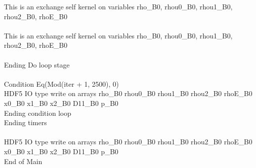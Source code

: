 \documentclass{article}
\begin{document}
\noindent This is an exchange self kernel on variables rho_B0, rhou0_B0, rhou1_B0, rhou2_B0, rhoE_B0\\\\\noindent This is an exchange self kernel on variables rho_B0, rhou0_B0, rhou1_B0, rhou2_B0, rhoE_B0\\\\\noindent Ending Do loop stage\\
\\\noindent Condition Eq(Mod(iter + 1, 2500), 0)\\\noindent HDF5 IO type write on arrays rho_B0 rhou0_B0 rhou1_B0 rhou2_B0 rhoE_B0 x0_B0 x1_B0 x2_B0 D11_B0 p_B0\\\noindent Ending condition loop %
\\\noindent Ending timers\\
\\\noindent HDF5 IO type write on arrays rho_B0 rhou0_B0 rhou1_B0 rhou2_B0 rhoE_B0 x0_B0 x1_B0 x2_B0 D11_B0 p_B0\\\noindent End of Main\\
\end{document}
